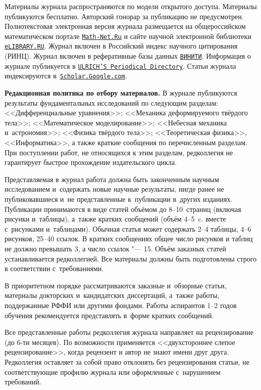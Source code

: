 Материалы журнала распространяются по модели открытого доступа. 
Материалы публикуются бесплатно. 
Авторский гонорар за публикацию не предусмотрен.
Полнотекстовая электронная версия журнала размещается на общероссийском математическом портале \href{http://www.mathnet.ru/vsgtu}{\tt Math-Net.Ru} и сайте научной электронной библиотеки \href{http://elibrary.ru/title_about.asp?id=5784}{\tt eLIBRARY.RU}. 
Журнал включен в Российский индекс научного цитирования (РИНЦ).
Журнал включен в реферативные базы данных \href{http://www.viniti.ru/}{\tt ВИНИТИ}. Информация о журнале публикуется в \href{http://www.ulrichsweb.com/}{\tt ULRICH'S Periodical Directory}. 
Статьи журнала индексируются в~\href{http://scholar.google.com}{\tt Scholar.Google.com}.


\smallskip

\textbf{Редакционная политика по  отбору материалов.}
В журнале публикуются результаты фундаментальных исследований по следующим разделам: 
<<Дифференциальные уравнения>>; 
<<Механика деформируемого твёрдого тела>>; \linebreak
<<Математическое моделирование>>;
<<Небесная механика и~астрономия>>; 
<<Физика твёрдого тела>>; 
<<Теоретическая физика>>, 
<<Информатика>>,
а также краткие сообщения по перечисленным разделам. 
При поступлении работ, не относящихся к этим разделам, редколлегия не гарантирует быстрое прохождение издательского цикла.

Представляемая в журнал работа должна быть законченным научным исследованием и~содержать новые научные результаты, нигде ранее не публиковавшиеся и~не представленные к~публикации в~других изданиях. 
Публикации принимаются в виде статей объёмом до 8--10~страниц (включая рисунки и~таблицы), а~также кратких сообщений (объём 4--5~c. вместе с~рисунками и~таблицами). 
Обычная статья может содержать 2--4 таблицы, 4--6 рисунков, 25--40 ссылок.
В кратких сообщениях общее число рисунков и таблиц не должно превышать 3, а число ссылок "--- 15.
Объём заказных статей устанавливается редколлегией. 
Все материалы должны быть подготовлены строго в соответствии с~требованиями.


В приоритетном порядке рассматриваются заказные и~обзорные статьи, материалы докторских и~кандидатских диссертаций, а~также работы, поддержанные РФФИ или другими фондами. 
Работы аспирантов 1--2 годов обучения рекомендуется представлять в~форме кратких сообщений.


Все представленные работы редколлегия журнала направляет на рецензирование (до 6-ти месяцев). 
По возможности применяется <<двухстороннее слепое рецензирование>>, когда  рецензент и автор не знают имени друг друга.
Редколлегия оставляет за собой право отклонять без рецензирования статьи, не соответствующие профилю журнала или оформленные с~нарушением требований.

